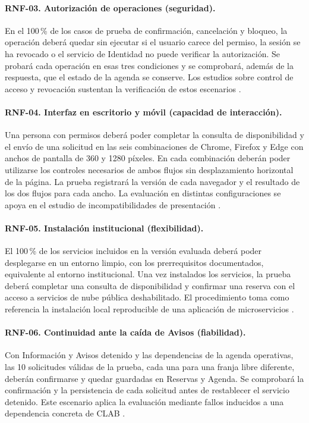 {  \paragraph{RNF-03. Autorización de operaciones (seguridad).}
  En el 100\,\% de los casos de prueba de confirmación, cancelación y bloqueo,
  la operación deberá quedar sin ejecutar si el usuario carece del permiso,
  la sesión se ha revocado o el servicio de Identidad no puede verificar la
  autorización. Se probará cada operación en esas tres condiciones y se
  comprobará, además de la respuesta, que el estado de la agenda se conserve.
  Los estudios sobre control de acceso y revocación sustentan la verificación
  de estos escenarios
  \cite{venckauskas2023Autorizacion,rasori2024Revocacion}.

  \paragraph{RNF-04. Interfaz en escritorio y móvil (capacidad de interacción).}
  Una persona con permisos deberá poder completar la consulta de disponibilidad
  y el envío de una solicitud en las seis combinaciones de Chrome, Firefox y
  Edge con anchos de pantalla de 360 y 1280 píxeles. En cada combinación
  deberán poder utilizarse los controles necesarios de ambos flujos sin
  desplazamiento horizontal de la página. La prueba registrará la versión
  de cada navegador y el resultado de los dos flujos para cada ancho.
  La evaluación en distintas configuraciones se apoya en el estudio de
  incompatibilidades de presentación \cite{watanabe2023Interfaz}.

  \paragraph{RNF-05. Instalación institucional (flexibilidad).}
  El 100\,\% de los servicios incluidos en la versión evaluada deberá poder
  desplegarse en un entorno limpio, con los prerrequisitos documentados,
  equivalente al entorno institucional. Una vez instalados los servicios,
  la prueba deberá completar una consulta de disponibilidad y confirmar una
  reserva con el acceso a servicios de nube pública deshabilitado.
  El procedimiento toma como referencia la instalación local reproducible
  de una aplicación de microservicios \cite{simoes2026Despliegue}.

  \paragraph{RNF-06. Continuidad ante la caída de Avisos (fiabilidad).}
  Con Información y Avisos detenido y las dependencias de la agenda operativas,
  las 10 solicitudes válidas de la prueba, cada una para una franja libre
  diferente, deberán confirmarse y quedar guardadas en Reservas y Agenda.
  Se comprobará la confirmación y la persistencia de cada solicitud antes
  de restablecer el servicio detenido. Este escenario aplica la evaluación
  mediante fallos inducidos a una dependencia concreta de CLAB
  \cite{alSaidAhmad2024Fallos}.

}

